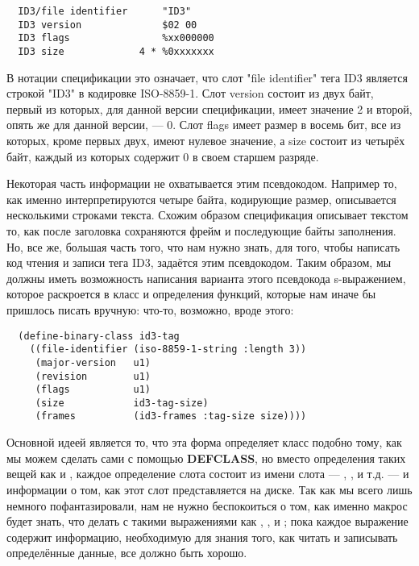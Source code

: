 \begin{verbatim}
  ID3/file identifier      "ID3"
  ID3 version              $02 00
  ID3 flags                %xx000000
  ID3 size             4 * %0xxxxxxx
\end{verbatim}

В нотации спецификации это означает, что слот "file identifier" тега ID3 является строкой
"ID3" в кодировке ISO-8859-1. Слот version состоит из двух байт, первый из которых, для
данной версии спецификации, имеет значение 2 и второй, опять же для данной версии, ---
0. Слот flags имеет размер в восемь бит, все из которых, кроме первых двух, имеют нулевое
значение, а size состоит из четырёх байт, каждый из которых содержит 0 в своем старшем
разряде.

Некоторая часть информации не охватывается этим псевдокодом. Например то, как именно
интерпретируются четыре байта, кодирующие размер, описывается несколькими строками
текста. Схожим образом спецификация описывает текстом то, как после заголовка сохраняются
фрейм и последующие байты заполнения. Но, все же, большая часть того, что нам нужно знать,
для того, чтобы написать код чтения и записи тега ID3, задаётся этим псевдокодом. Таким
образом, мы должны иметь возможность написания варианта этого псевдокода s-выражением,
которое раскроется в класс и определения функций, которые нам иначе бы пришлось писать
вручную: что-то, возможно, вроде этого:

\begin{lstlisting}
  (define-binary-class id3-tag
    ((file-identifier (iso-8859-1-string :length 3))
     (major-version   u1)
     (revision        u1)
     (flags           u1)
     (size            id3-tag-size)
     (frames          (id3-frames :tag-size size))))
\end{lstlisting}

Основной идеей является то, что эта форма определяет класс  подобно тому,
как мы можем сделать сами с помощью \textbf{DEFCLASS}, но вместо определения таких вещей
как  и , каждое определение слота состоит из имени слота
--- , , и т.д. --- и информации о том, как этот
слот представляется на диске. Так как мы всего лишь немного пофантазировали, нам не нужно
беспокоиться о том, как именно макрос  будет знать, что делать с
такими выражениями как , ,
 и ; пока каждое выражение содержит
информацию, необходимую для знания того, как читать и записывать определённые данные, все
должно быть хорошо.

